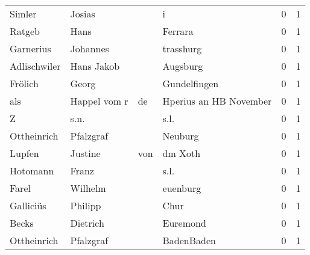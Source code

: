\begin{tabular}{llllrr}
                   Simler &                             Josias &             &                                           i &          0 &         1 \\
                   Ratgeb &                               Hans &             &                                     Ferrara &          0 &         1 \\
                Garnerius &                           Johannes &             &                                   trasshurg &          0 &         1 \\
             Adlischwiler &                         Hans Jakob &             &                                    Augsburg &          0 &         1 \\
                  Frölich &                              Georg &             &                                Gundelfingen &          0 &         1 \\
                      als &                       Happel vom r &          de &                      Hperius an HB November &          0 &         1 \\
                        Z &                               s.n. &             &                                        s.l. &          0 &         1 \\
              Ottheinrich &                          Pfalzgraf &             &                                     Neuburg &          0 &         1 \\
                   Lupfen &                            Justine &         von &                                     dm Xoth &          0 &         1 \\
                 Hotomann &                              Franz &             &                                        s.l. &          0 &         1 \\
                    Farel &                            Wilhelm &             &                                    euenburg &          0 &         1 \\
                Galliciüs &                            Philipp &             &                                        Chur &          0 &         1 \\
                    Becks &                           Dietrich &             &                                    Euremond &          0 &         1 \\
              Ottheinrich &                          Pfalzgraf &             &                                  BadenBaden &          0 &         1 \\

\end{tabular}
